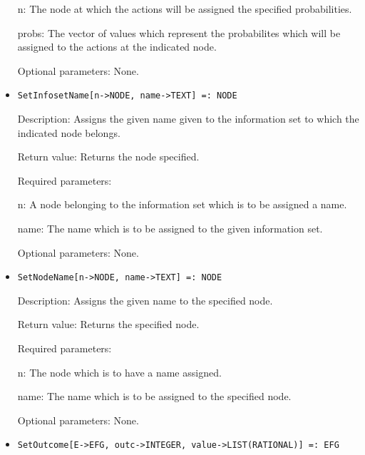 \begin{itemize}
\bd
\item
[n:] The node at which the actions will be assigned the specified
probabilities.
\item
[probs:] The vector of values which represent the probabilites which
will be assigned to the actions at the indicated node.
\ed

\item
[Optional parameters:] None.
\ed

\item

\protect \large \begin{verbatim}
SetInfosetName[n->NODE, name->TEXT] =: NODE
\end{verbatim}\normalsize

\bd
\item
[Description:] Assigns the given name given to the information set to
which the indicated node belongs.
\item
[Return value:] Returns the node specified.
\item
[Required parameters:]\hfil\null
	
\bd
\item
[n:] A node belonging to the information set which is to be assigned a
name.
\item
[name:] The name which is to be assigned to the given information set.
\ed

\item
[Optional parameters:] None.
\ed

\item

\protect \large \begin{verbatim}
SetNodeName[n->NODE, name->TEXT] =: NODE
\end{verbatim}\normalsize

\bd
\item
[Description:] Assigns the given name to the specified node.
\item
[Return value:] Returns the specified node.
\item
[Required parameters:]\hfil\null
	
\bd
\item
[n:] The node which is to have a name assigned.
\item
[name:] The name which is to be assigned to the specified node.
\ed

\item
[Optional parameters:] None.
\ed

\item
\protect \large \begin{verbatim}
SetOutcome[E->EFG, outc->INTEGER, value->LIST(RATIONAL)] =: EFG
\end{verbatim}\normalsize
   

\end{itemize}
